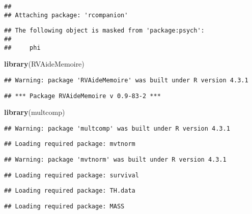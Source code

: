\documentclass[
]{article}
\newenvironment{Shaded}{\begin{snugshade}}{\end{snugshade}}
\newcommand{\FunctionTok}[1]{\textcolor[rgb]{0.13,0.29,0.53}{\textbf{#1}}}
\newcommand{\NormalTok}[1]{#1}
\begin{document}
\begin{verbatim}
## 
## Attaching package: 'rcompanion'
\end{verbatim}

\begin{verbatim}
## The following object is masked from 'package:psych':
## 
##     phi
\end{verbatim}

\begin{Shaded}
\begin{Highlighting}[]
\FunctionTok{library}\NormalTok{(RVAideMemoire)}
\end{Highlighting}
\end{Shaded}

\begin{verbatim}
## Warning: package 'RVAideMemoire' was built under R version 4.3.1
\end{verbatim}

\begin{verbatim}
## *** Package RVAideMemoire v 0.9-83-2 ***
\end{verbatim}

\begin{Shaded}
\begin{Highlighting}[]
\FunctionTok{library}\NormalTok{(multcomp)}
\end{Highlighting}
\end{Shaded}

\begin{verbatim}
## Warning: package 'multcomp' was built under R version 4.3.1
\end{verbatim}

\begin{verbatim}
## Loading required package: mvtnorm
\end{verbatim}

\begin{verbatim}
## Warning: package 'mvtnorm' was built under R version 4.3.1
\end{verbatim}

\begin{verbatim}
## Loading required package: survival
\end{verbatim}

\begin{verbatim}
## Loading required package: TH.data
\end{verbatim}

\begin{verbatim}
## Loading required package: MASS
\end{verbatim}
\end{document}
